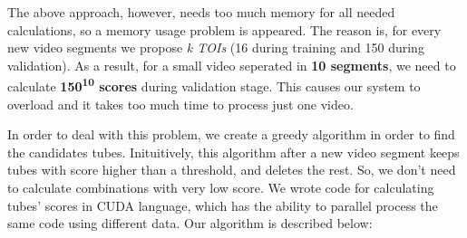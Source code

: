\documentclass{report}
\begin{document}
The above approach, however, needs too much memory for all needed calculations, so a memory usage  problem is
appeared. The reason is, for every new video segments we propose \textit{k TOIs} (16 during training and 150 during validation).
As a result, for a small video seperated in  \textbf{10 segments}, we need to calculate 
\textbf{  150\textsuperscript{10} scores} during validation stage. This causes our system to overload and it takes too much time to process
just one video. \par

In order to deal with this problem, we create a greedy algorithm in order to find the candidates tubes. Inituitively, this algorithm after
a new video segment keeps tubes with score higher than a threshold, and deletes the rest. So, we don't need to calculate combinations with
very low score. We wrote code for calculating tubes' scores in CUDA language, which has the ability to
parallel process the same code using different data. Our algorithm is described below:
\end{document}
